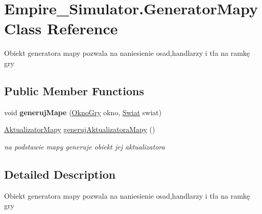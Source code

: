 \hypertarget{class_empire___simulator_1_1_generator_mapy}{\section{Empire\+\_\+\+Simulator.\+Generator\+Mapy Class Reference}
\label{class_empire___simulator_1_1_generator_mapy}
}


Obiekt generatora mapy pozwala na naniesienie osad,handlarzy i tła na ramkę gry  


\subsection*{Public Member Functions}
\begin{DoxyCompactItemize}
\item 
\hypertarget{class_empire___simulator_1_1_generator_mapy_a7bd64ecdfb35d65f5f87755533562ce7}{void {\bfseries generuj\+Mape} (\hyperlink{class_empire___simulator_1_1_okno_gry}{Okno\+Gry} okno, \hyperlink{class_empire___simulator_1_1_swiat}{Swiat} swiat)}\label{class_empire___simulator_1_1_generator_mapy_a7bd64ecdfb35d65f5f87755533562ce7}

\item 
\hyperlink{class_empire___simulator_1_1_aktualizator_mapy}{Aktualizator\+Mapy} \hyperlink{class_empire___simulator_1_1_generator_mapy_a0c22f0b317eae838c2e15f5baaa1fa31}{generuj\+Aktualizatora\+Mapy} ()
\begin{DoxyCompactList}\small\item\em na podstawie mapy generuje obiekt jej aktualizatora \end{DoxyCompactList}\end{DoxyCompactItemize}


\subsection{Detailed Description}
Obiekt generatora mapy pozwala na naniesienie osad,handlarzy i tła na ramkę gry 



